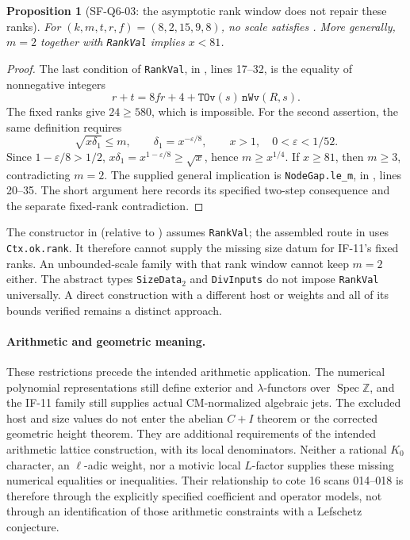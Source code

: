 \documentclass[11pt,a4paper]{article}
\newtheorem{proposition}[theorem]{Proposition}
\theoremstyle{definition}
\theoremstyle{remark}
\begin{document}
\begin{proposition}[SF-Q6-03: the asymptotic rank window does not repair these ranks]
For $(k,m,t,r,f)=(8,2,15,9,8)$, no scale satisfies
. More generally,
$m=2$ together with \texttt{RankVal} implies $x<81$.
\end{proposition}
\begin{proof}
The last condition of \texttt{RankVal}, in
,
lines 17--32, is the equality of nonnegative integers
\[
 r+t=8fr+4+\texttt{TOv}(s)\,\texttt{nWv}(R,s).
\]
The fixed ranks give $24\ge580$, which is impossible.
For the second assertion, the same definition requires
\[
 \sqrt{x\delta_1}\le m,\qquad
 \delta_1=x^{-\varepsilon/8},\qquad
 x>1,\quad 0<\varepsilon<1/52.
\]
Since $1-\varepsilon/8>1/2$,
$x\delta_1=x^{1-\varepsilon/8}\ge\sqrt{x}$, hence
$m\ge x^{1/4}$. If $x\ge81$, then $m\ge3$,
contradicting $m=2$. The supplied general implication is
\texttt{NodeGap.le\_m}, in
,
lines 20--35. The short argument here records its specified
two-step consequence and the separate fixed-rank contradiction.
\end{proof}

The constructor  in
(relative to ) assumes
\texttt{RankVal}; the assembled route in
uses \texttt{Ctx.ok.rank}. It therefore cannot supply the
missing size datum for IF-11's fixed ranks. An unbounded-scale
family with that rank window cannot keep $m=2$ either.
The abstract types \texttt{SizeData}\(_2\) and
\texttt{DivInputs} do not impose \texttt{RankVal} universally.
A direct construction with a different host or weights and all
of its bounds verified remains a distinct approach.

\paragraph{Arithmetic and geometric meaning.}
These restrictions precede the intended arithmetic application.
The numerical polynomial representations still define exterior and
$\lambda$-functors over $\operatorname{Spec}\mathbb Z$, and the
IF-11 family still supplies actual CM-normalized algebraic jets.
The excluded host and size values do not enter the abelian
$C+I$ theorem or the corrected geometric height theorem. They
are additional requirements of the intended arithmetic lattice
construction, with its local denominators. Neither a rational
$K_0$ character, an $\ell$-adic weight, nor a motivic local
$L$-factor supplies these missing numerical equalities or
inequalities. Their relationship to cote 16 scans 014--018 is
therefore through the explicitly specified coefficient and
operator models, not through an identification of those
arithmetic constraints with a Lefschetz conjecture.
\end{document}
